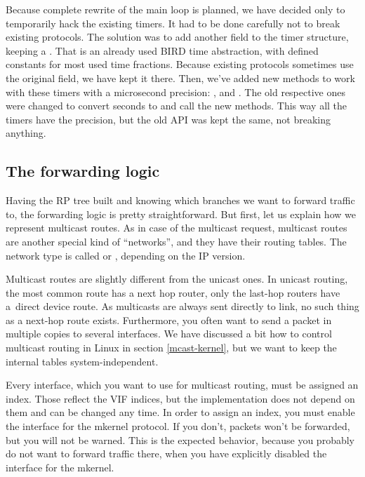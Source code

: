Because complete rewrite of the main loop is planned, we have decided only to
temporarily hack the existing timers. It had to be done carefully not to break
existing protocols. The solution was to add another field to the timer
structure, keeping a . That is an already used BIRD time abstraction, with
defined constants for most used time fractions. Because existing protocols
sometimes use the original field, we have kept it there. Then, we've added new
methods to work with these timers with a microsecond precision:
,  and
. The old respective ones were changed
to convert seconds to  and call the new methods. This way all the timers
have the  precision, but the old API was kept the same, not breaking
anything.

\subsection{The forwarding logic}
Having the RP tree built and knowing which branches we want to forward traffic
to, the forwarding logic is pretty straightforward. But first, let us explain
how we represent multicast routes. As in case of the multicast request,
multicast routes are another special kind of ``networks'', and they have their
routing tables. The network type is called  or ,
depending on the IP version.

Multicast routes are slightly different from the unicast ones. In unicast routing,
the most common route has a next hop router, only the last-hop routers have
a~direct device route. As multicasts are always sent directly to link, no such
thing as a next-hop route exists. Furthermore, you often want to send a packet in
multiple copies to several interfaces. We have discussed a bit how to control
multicast routing in Linux in section \ref{mcast-kernel}, but we want to keep
the internal tables system-independent.

Every interface, which you want to use for multicast routing, must be assigned
an index. Those reflect the VIF indices, but the implementation does not depend
on them and can be changed any time. In order to assign an index, you must enable the
interface for the mkernel protocol. If you don't, packets won't be
forwarded, but you will not be warned. This is the expected behavior, because
you probably do not want to forward traffic there, when you have explicitly
disabled the interface for the mkernel.

